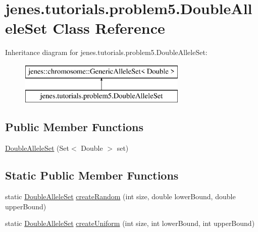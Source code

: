 \hypertarget{classjenes_1_1tutorials_1_1problem5_1_1_double_allele_set}{\section{jenes.\-tutorials.\-problem5.\-Double\-Allele\-Set Class Reference}
\label{classjenes_1_1tutorials_1_1problem5_1_1_double_allele_set}
}
Inheritance diagram for jenes.\-tutorials.\-problem5.\-Double\-Allele\-Set\-:\begin{figure}[H]
\begin{center}
\leavevmode
\includegraphics[height=2.000000cm]{classjenes_1_1tutorials_1_1problem5_1_1_double_allele_set}
\end{center}
\end{figure}
\subsection*{Public Member Functions}
\begin{DoxyCompactItemize}
\item 
\hyperlink{classjenes_1_1tutorials_1_1problem5_1_1_double_allele_set_a3669132c61485f50aebe440a0602b2e5}{Double\-Allele\-Set} (Set$<$ Double $>$ set)
\end{DoxyCompactItemize}
\subsection*{Static Public Member Functions}
\begin{DoxyCompactItemize}
\item 
static \hyperlink{classjenes_1_1tutorials_1_1problem5_1_1_double_allele_set}{Double\-Allele\-Set} \hyperlink{classjenes_1_1tutorials_1_1problem5_1_1_double_allele_set_ac831f648cab055cd70e3f1b47225529e}{create\-Random} (int size, double lower\-Bound, double upper\-Bound)
\item 
static \hyperlink{classjenes_1_1tutorials_1_1problem5_1_1_double_allele_set}{Double\-Allele\-Set} \hyperlink{classjenes_1_1tutorials_1_1problem5_1_1_double_allele_set_a75aa1cf3be84d1e3f5e50ecc0acc5b4b}{create\-Uniform} (int size, int lower\-Bound, int upper\-Bound)
\end{DoxyCompactItemize}


